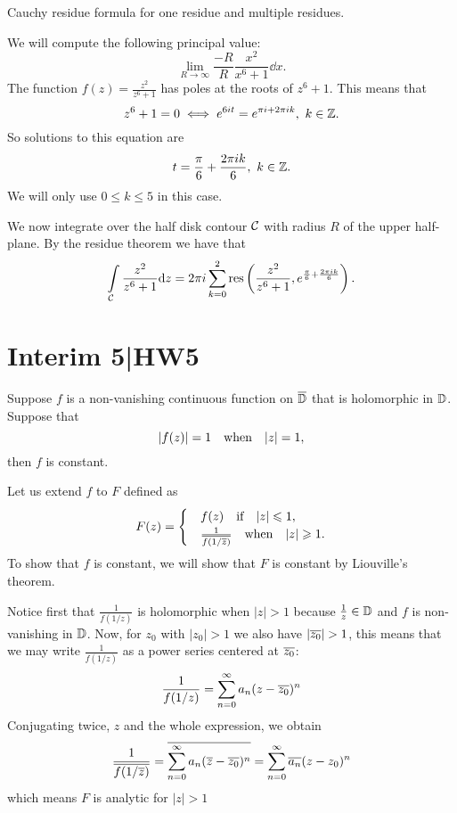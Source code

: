 \documentclass[12pt]{memoir}
\begin{document}
Cauchy residue formula for one residue and multiple residues.

\begin{Ex}
    We will compute the following principal value:
    $$\lim_{R\to\infty}\frac{-R}{R}\frac{x^2}{x^6+1}\dd x.$$
    The function $f(z)=\frac{z^2}{z^6+1}$ has poles at the roots of $z^6+1$. This means that 
    $$z^6+1=0\iff e^{6it}=e^{\pi i+2\pi ik},\ k\in\mathbb{Z}.$$
    So solutions to this equation are 
    $$t=\frac{\pi}{6}+\frac{2\pi ik}{6},\ k\in\bZ.$$
    We will only use $0\leq k\leq 5$ in this case.\par
    We now integrate over the half disk contour $\mathcal{C}$ with radius $R$ of the upper half-plane. By the residue theorem we have that 
    $$\int\limits_{\mathcal{C}}\frac{z^2}{z^6+1}\dd z=2\pi i\sum_{k=0}^{2}\operatorname*{res}\left(\frac{z^2}{z^6+1},e^{\frac{\pi}{6}+\frac{2\pi ik}{6}}\right).$$ 
\end{Ex}


\section{Interim 5|HW5}

\begin{Ej}
    Suppose $f$ is a non-vanishing continuous function on $\overline{\mathbb{D}}$ that is holomorphic in $\mathbb{D}$. Suppose that 
    $$|f(z)|=1\quad\text{when}\quad|z|=1,$$
    then $f$ is constant. 
\end{Ej}

\begin{ptcbr}
Let us extend $f$ to $F$ defined as 
$$F(z)=\begin{cases}
    &f(z)\quad\text{if}\quad|z|\leqslant 1,\\
    &\frac{1}{\overline{f(1/\overline z)}}\quad\text{when}\quad|z|\geqslant 1.
\end{cases}$$
To show that $f$ is constant, we will show that $F$ is constant by Liouville's theorem.\par 
Notice first that $\frac{1}{f(1/z)}$ is holomorphic when $|z|>1$ because $\frac{1}{z}\in\mathbb{D}$ and $f$ is non-vanishing in $\mathbb{D}$. Now, for $z_0$ with $|z_0|>1$ we also have $|\ov{z_0}|>1$, this means that we may write $\frac{1}{f(1/z)}$ as a power series centered at $\overline{z_0}$:
$$\frac{1}{f(1/z)}=\sum_{n=0}^{\infty
}a_n(z-\overline{z_0})^n$$
Conjugating twice, $z$ and the whole expression, we obtain 
$$\frac{1}{\overline{f(1/\overline{z})}}=\overline{\sum_{n=0}^{\infty
}a_n(\overline{z}-\overline{z_0})^n}=\sum_{n=0}^{\infty}\overline{a_n}(z-z_0)^n$$
which means $F$ is analytic for $|z|>1$
\end{ptcbr}
\end{document}
